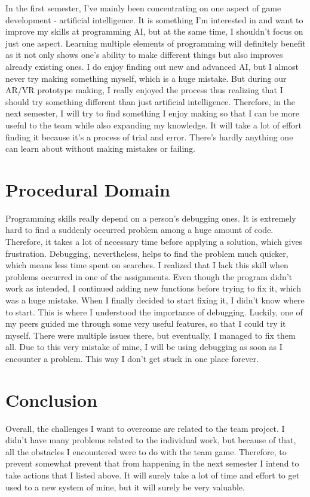 \documentclass{scrartcl}
\begin{document}
In the first semester, I've mainly been concentrating on one aspect of game development - artificial intelligence. It is something I'm interested in and want to improve my skills at programming AI, but at the same time, I shouldn't focus on just one aspect. Learning multiple elements of programming will definitely benefit as it not only shows one's ability to make different things but also improves already existing ones. I do enjoy finding out new and advanced AI, but I almost never try making something myself, which is a huge mistake. But during our AR/VR prototype making, I really enjoyed the process thus realizing that I should try something different than just artificial intelligence. Therefore, in the next semester, I will try to find something I enjoy making so that I can be more useful to the team while also expanding my knowledge. It will take a lot of effort finding it because it's a process of trial and error. There's hardly anything one can learn about without making mistakes or failing.

\section{Procedural Domain}

Programming skills really depend on a person's debugging ones. It is extremely hard to find a suddenly occurred problem among a huge amount of code. Therefore, it takes a lot of necessary time before applying a solution, which gives frustration. Debugging, nevertheless, helps to find the problem much quicker, which means less time spent on searches. I realized that I lack this skill when problems occurred in one of the assignments. Even though the program didn't work as intended, I continued adding new functions before trying to fix it, which was a huge mistake. When I finally decided to start fixing it, I didn't know where to start. This is where I understood the importance of debugging. Luckily, one of my peers guided me through some very useful features, so that I could try it myself. There were multiple issues there, but eventually, I managed to fix them all. Due to this very mistake of mine, I will be using debugging as soon as I encounter a problem. This way I don't get stuck in one place forever.

\section{Conclusion}

Overall, the challenges I want to overcome are related to the team project. I didn't have many problems related to the individual work, but because of that, all the obstacles I encountered were to do with the team game. Therefore, to prevent somewhat prevent that from happening in the next semester I intend to take actions that I listed above. It will surely take a lot of time and effort to get used to a new system of mine, but it will surely be very valuable.



\end{document}
